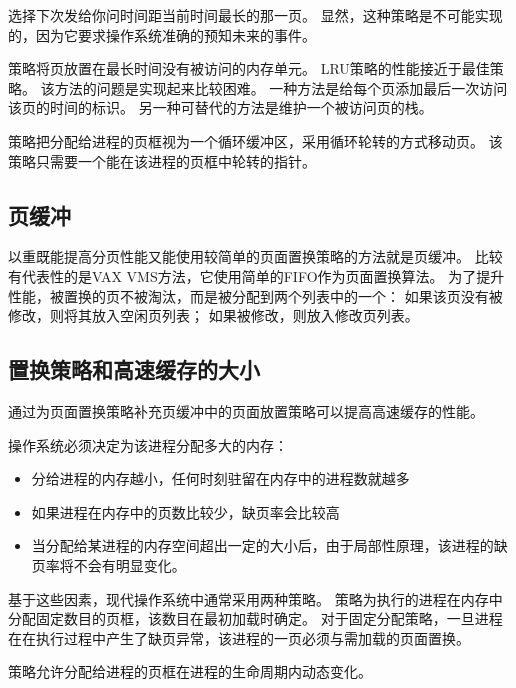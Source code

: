 {{        选择下次发给你问时间距当前时间最长的那一页。
        显然，这种策略是不可能实现的，因为它要求操作系统准确的预知未来的事件。

        策略将页放置在最长时间没有被访问的内存单元。
        LRU策略的性能接近于最佳策略。
        该方法的问题是实现起来比较困难。
        一种方法是给每个页添加最后一次访问该页的时间的标识。
        另一种可替代的方法是维护一个被访问页的栈。

        策略把分配给进程的页框视为一个循环缓冲区，采用循环轮转的方式移动页。
        该策略只需要一个能在该进程的页框中轮转的指针。
    }

    \subsection{页缓冲}
    {
        以重既能提高分页性能又能使用较简单的页面置换策略的方法就是页缓冲。
        比较有代表性的是VAX VMS方法，它使用简单的FIFO作为页面置换算法。
        为了提升性能，被置换的页不被淘汰，而是被分配到两个列表中的一个：
        如果该页没有被修改，则将其放入空闲页列表；
        如果被修改，则放入修改页列表。
    }

    \subsection{置换策略和高速缓存的大小}
    {
        通过为页面置换策略补充页缓冲中的页面放置策略可以提高高速缓存的性能。

        {
            操作系统必须决定为该进程分配多大的内存：

            \begin{itemize}
                \item 分给进程的内存越小，任何时刻驻留在内存中的进程数就越多
                \item 如果进程在内存中的页数比较少，缺页率会比较高
                \item 当分配给某进程的内存空间超出一定的大小后，由于局部性原理，该进程的缺页率将不会有明显变化。
            \end{itemize}

            基于这些因素，现代操作系统中通常采用两种策略。
            策略为执行的进程在内存中分配固定数目的页框，该数目在最初加载时确定。
            对于固定分配策略，一旦进程在在执行过程中产生了缺页异常，该进程的一页必须与需加载的页面置换。

            策略允许分配给进程的页框在进程的生命周期内动态变化。

}}}
